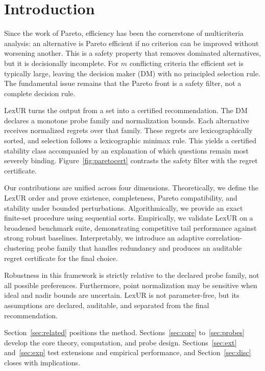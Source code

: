 \section{Introduction}
\label{sec:intro}

Since the work of Pareto, efficiency has been the cornerstone of multicriteria analysis: an alternative is Pareto efficient if no criterion can be improved without worsening another. This is a safety property that removes dominated alternatives, but it is decisionally incomplete. For $m$ conflicting criteria the efficient set is typically large, leaving the decision maker (DM) with no principled selection rule. The fundamental issue remains that the Pareto front is a safety filter, not a complete decision rule.

LexUR turns the output from a set into a certified recommendation. The DM declares a monotone probe family and normalization bounds. Each alternative receives normalized regrets over that family. These regrets are lexicographically sorted, and selection follows a lexicographic minimax rule. This yields a certified stability class accompanied by an explanation of which questions remain most severely binding. Figure~\ref{fig:paretocert} contrasts the safety filter with the regret certificate.



Our contributions are unified across four dimensions. Theoretically, we define the LexUR order and prove existence, completeness, Pareto compatibility, and stability under bounded perturbations. Algorithmically, we provide an exact finite-set procedure using sequential sorts. Empirically, we validate LexUR on a broadened benchmark suite, demonstrating competitive tail performance against strong robust baselines. Interpretably, we introduce an adaptive correlation-clustering probe family that handles redundancy and produces an auditable regret certificate for the final choice.

Robustness in this framework is strictly relative to the declared probe family, not all possible preferences. Furthermore, point normalization may be sensitive when ideal and nadir bounds are uncertain. LexUR is not parameter-free, but its assumptions are declared, auditable, and separated from the final recommendation.

Section~\ref{sec:related} positions the method. Sections~\ref{sec:core} to~\ref{sec:probes} develop the core theory, computation, and probe design. Sections~\ref{sec:ext} and~\ref{sec:exp} test extensions and empirical performance, and Section~\ref{sec:disc} closes with implications.
